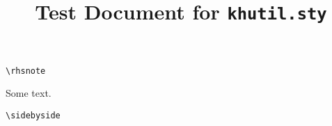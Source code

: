 \documentclass[11pt]{khplain}
\title{Test Document for \texttt{khutil.sty}}
\begin{document}
\maketitle

\texttt{\textbackslash rhsnote}

Some text. 

\texttt{\textbackslash sidebyside}

\sidebyside{\lipsum[1]}{\lipsum[2]}
\end{document}

